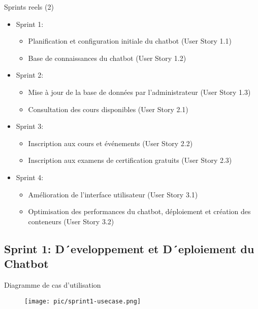 \documentclass[aspectratio=169]{beamer}
\begin{document}
   \begin{frame}{Sprints reels (2)}
 
    \begin{itemize}
        \item Sprint 1:
        \begin{itemize}
            \item Planification et configuration initiale du chatbot (User Story 1.1)
            \item Base de connaissances du chatbot (User Story 1.2)
        \end{itemize}
        
        \item Sprint 2:
        \begin{itemize}
            \item Mise à jour de la base de données par l’administrateur (User Story 1.3)
            \item Consultation des cours disponibles (User Story 2.1)
        \end{itemize}
        
        \item Sprint 3:
        \begin{itemize}
            \item Inscription aux cours et événements (User Story 2.2)
            \item Inscription aux examens de certification gratuits (User Story 2.3)
        \end{itemize}
        
        \item Sprint 4:
        \begin{itemize}
            \item Amélioration de l’interface utilisateur (User Story 3.1)
            \item Optimisation des performances du chatbot, déploiement et création des conteneurs (User Story 3.2)
        \end{itemize}
    \end{itemize}
    
   \end{frame}



\subsection{Sprint 1: D´eveloppement et D´eploiement du Chatbot}
\begin{frame}{Diagramme de cas d'utilisation}

\begin{figure}[htpb]
        \centering
        \texttt{[image: pic/sprint1-usecase.png]}
\end{figure}
\end{frame}
\end{document}
